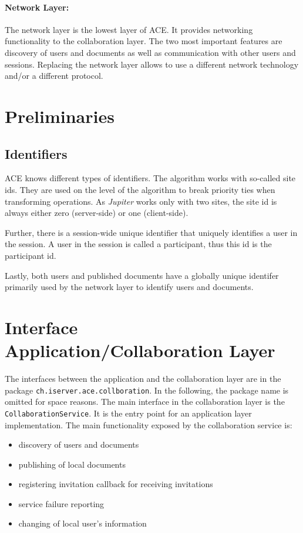 \paragraph{Network Layer:} The network layer is the lowest layer of ACE. It 
provides networking functionality to the collaboration layer. The two most 
important features are discovery of users and documents as well as communication 
with other users and sessions. Replacing the network layer allows to use a 
different network technology and/or a different protocol.



\section{Preliminaries}

\subsection{Identifiers}
ACE knows different types of identifiers. The algorithm works with so-called
site ids. They are used on the level of the algorithm to break priority
ties when transforming operations. As \emph{Jupiter} works only with two
sites, the site id is always either zero (server-side) or one (client-side).

Further, there is a session-wide unique identifier that uniquely identifies
a user in the session. A user in the session is called a participant, thus
this id is the participant id.

Lastly, both users and published documents have a globally unique identifer
primarily used by the network layer to identify users and documents.



\section{Interface Application/Collaboration Layer}
The interfaces between the application and the collaboration layer are in
the package \texttt{ch.\-iserver.\-ace.\-collboration}. In the following,
the package name is omitted for space reasons. The main interface in
the collaboration layer is the \texttt{Collaboration\-Service}.
It is the entry point for an application layer implementation. The main 
functionality exposed by the collaboration service is:
\begin{itemize}
 \item discovery of users and documents
 \item publishing of local documents
 \item registering invitation callback for receiving invitations
 \item service failure reporting
 \item changing of local user's information
\end{itemize}


